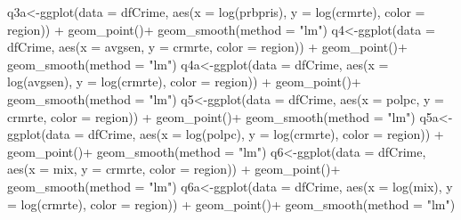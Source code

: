\documentclass[]{article}
\newenvironment{Shaded}{}{}
\newcommand{\DataTypeTok}[1]{#1}
\newcommand{\KeywordTok}[1]{\textcolor[rgb]{0.00,0.00,1.00}{#1}}
\newcommand{\NormalTok}[1]{#1}
\newcommand{\OperatorTok}[1]{#1}
\newcommand{\StringTok}[1]{\textcolor[rgb]{0.00,0.50,0.50}{#1}}
\begin{document}
\begin{Shaded}
\begin{Highlighting}[]
\NormalTok{q3a<-}\KeywordTok{ggplot}\NormalTok{(}\DataTypeTok{data =}\NormalTok{ dfCrime, }\KeywordTok{aes}\NormalTok{(}\DataTypeTok{x =} \KeywordTok{log}\NormalTok{(prbpris), }\DataTypeTok{y =} \KeywordTok{log}\NormalTok{(crmrte), }\DataTypeTok{color =}\NormalTok{ region)) }\OperatorTok{+}\StringTok{ }
\StringTok{      }\KeywordTok{geom_point}\NormalTok{()}\OperatorTok{+}
\StringTok{  }\KeywordTok{geom_smooth}\NormalTok{(}\DataTypeTok{method =} \StringTok{"lm"}\NormalTok{)}
\NormalTok{q4<-}\KeywordTok{ggplot}\NormalTok{(}\DataTypeTok{data =}\NormalTok{ dfCrime, }\KeywordTok{aes}\NormalTok{(}\DataTypeTok{x =}\NormalTok{ avgsen, }\DataTypeTok{y =}\NormalTok{ crmrte, }\DataTypeTok{color =}\NormalTok{ region)) }\OperatorTok{+}\StringTok{ }
\StringTok{      }\KeywordTok{geom_point}\NormalTok{()}\OperatorTok{+}
\StringTok{  }\KeywordTok{geom_smooth}\NormalTok{(}\DataTypeTok{method =} \StringTok{"lm"}\NormalTok{)}
\NormalTok{q4a<-}\KeywordTok{ggplot}\NormalTok{(}\DataTypeTok{data =}\NormalTok{ dfCrime, }\KeywordTok{aes}\NormalTok{(}\DataTypeTok{x =} \KeywordTok{log}\NormalTok{(avgsen), }\DataTypeTok{y =} \KeywordTok{log}\NormalTok{(crmrte), }\DataTypeTok{color =}\NormalTok{ region)) }\OperatorTok{+}\StringTok{ }
\StringTok{      }\KeywordTok{geom_point}\NormalTok{()}\OperatorTok{+}
\StringTok{  }\KeywordTok{geom_smooth}\NormalTok{(}\DataTypeTok{method =} \StringTok{"lm"}\NormalTok{)}
\NormalTok{q5<-}\KeywordTok{ggplot}\NormalTok{(}\DataTypeTok{data =}\NormalTok{ dfCrime, }\KeywordTok{aes}\NormalTok{(}\DataTypeTok{x =}\NormalTok{ polpc, }\DataTypeTok{y =}\NormalTok{ crmrte, }\DataTypeTok{color =}\NormalTok{ region)) }\OperatorTok{+}\StringTok{ }
\StringTok{      }\KeywordTok{geom_point}\NormalTok{()}\OperatorTok{+}
\StringTok{  }\KeywordTok{geom_smooth}\NormalTok{(}\DataTypeTok{method =} \StringTok{"lm"}\NormalTok{)}
\NormalTok{q5a<-}\KeywordTok{ggplot}\NormalTok{(}\DataTypeTok{data =}\NormalTok{ dfCrime, }\KeywordTok{aes}\NormalTok{(}\DataTypeTok{x =} \KeywordTok{log}\NormalTok{(polpc), }\DataTypeTok{y =} \KeywordTok{log}\NormalTok{(crmrte), }\DataTypeTok{color =}\NormalTok{ region)) }\OperatorTok{+}\StringTok{ }
\StringTok{      }\KeywordTok{geom_point}\NormalTok{()}\OperatorTok{+}
\StringTok{  }\KeywordTok{geom_smooth}\NormalTok{(}\DataTypeTok{method =} \StringTok{"lm"}\NormalTok{)}
\NormalTok{q6<-}\KeywordTok{ggplot}\NormalTok{(}\DataTypeTok{data =}\NormalTok{ dfCrime, }\KeywordTok{aes}\NormalTok{(}\DataTypeTok{x =}\NormalTok{ mix, }\DataTypeTok{y =}\NormalTok{ crmrte, }\DataTypeTok{color =}\NormalTok{ region)) }\OperatorTok{+}\StringTok{ }
\StringTok{      }\KeywordTok{geom_point}\NormalTok{()}\OperatorTok{+}
\StringTok{  }\KeywordTok{geom_smooth}\NormalTok{(}\DataTypeTok{method =} \StringTok{"lm"}\NormalTok{)}
\NormalTok{q6a<-}\KeywordTok{ggplot}\NormalTok{(}\DataTypeTok{data =}\NormalTok{ dfCrime, }\KeywordTok{aes}\NormalTok{(}\DataTypeTok{x =} \KeywordTok{log}\NormalTok{(mix), }\DataTypeTok{y =} \KeywordTok{log}\NormalTok{(crmrte), }\DataTypeTok{color =}\NormalTok{ region)) }\OperatorTok{+}\StringTok{ }
\StringTok{      }\KeywordTok{geom_point}\NormalTok{()}\OperatorTok{+}
\StringTok{  }\KeywordTok{geom_smooth}\NormalTok{(}\DataTypeTok{method =} \StringTok{"lm"}\NormalTok{)}


\end{Highlighting}
\end{Shaded}
\end{document}
